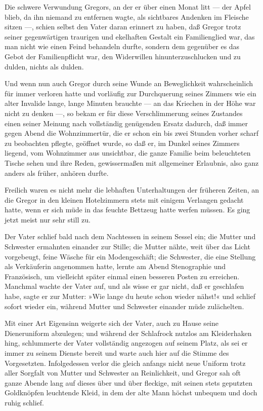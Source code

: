 \noindent{}Die schwere Verwundung Gregors, an der er über einen Monat litt --- der
Apfel blieb, da ihn niemand zu entfernen wagte, als sichtbares Andenken
im Fleische sitzen ---, schien selbst den Vater daran erinnert zu haben,
daß Gregor trotz seiner gegenwärtigen traurigen und ekelhaften Gestalt
ein Familienglied war, das man nicht wie einen Feind behandeln durfte,
sondern dem gegenüber es das Gebot der Familienpflicht war, den
Widerwillen hinunterzuschlucken und zu dulden, nichts als dulden.

Und wenn nun auch Gregor durch seine Wunde an Beweglichkeit
wahrscheinlich für immer verloren hatte und vorläufig zur Durchquerung
seines Zimmers wie ein alter Invalide lange, lange Minuten brauchte ---
an das Kriechen in der Höhe war nicht zu denken ---, so bekam er für
diese Verschlimmerung seines Zustandes einen seiner Meinung nach
vollständig genügenden Ersatz dadurch, daß immer gegen Abend die
Wohnzimmertür, die er schon ein bis zwei Stunden vorher scharf zu
beobachten pflegte, geöffnet wurde, so daß er, im Dunkel seines Zimmers
liegend, vom Wohnzimmer aus unsichtbar, die ganze Familie beim
beleuchteten Tische sehen und ihre Reden, gewissermaßen mit allgemeiner
Erlaubnis, also ganz anders als früher, anhören durfte.

Freilich waren es nicht mehr die lebhaften Unterhaltungen der früheren
Zeiten, an die Gregor in den kleinen Hotelzimmern stets mit einigem
Verlangen gedacht hatte, wenn er sich müde in das feuchte Bettzeug hatte
werfen müssen. Es ging jetzt meist nur sehr still zu.

Der Vater schlief
bald nach dem Nachtessen in seinem Sessel ein; die Mutter und Schwester
ermahnten einander zur Stille; die Mutter nähte, weit über das Licht
vorgebeugt, feine Wäsche für ein Modengeschäft; die Schwester, die eine
Stellung als Verkäuferin angenommen hatte, lernte am Abend Stenographie
und Französisch, um vielleicht später einmal einen besseren Posten zu
erreichen. Manchmal wachte der Vater auf, und als wisse er gar nicht,
daß er geschlafen habe, sagte er zur Mutter: »Wie lange du heute schon
wieder nähst!« und schlief sofort wieder ein, während Mutter und
Schwester einander müde zulächelten.

Mit einer Art Eigensinn weigerte sich der Vater, auch zu Hause seine
Dieneruniform abzulegen; und während der Schlafrock nutzlos am
Kleiderhaken hing, schlummerte der Vater vollständig angezogen auf
seinem Platz, als sei er immer zu seinem Dienste bereit und warte auch
hier auf die Stimme des Vorgesetzten. Infolgedessen verlor die gleich
anfangs nicht neue Uniform trotz aller Sorgfalt von Mutter und Schwester
an Reinlichkeit, und Gregor sah oft ganze Abende lang auf dieses über
und über fleckige, mit seinen stets geputzten Goldknöpfen leuchtende
Kleid, in dem der alte Mann höchst unbequem und doch ruhig schlief.

